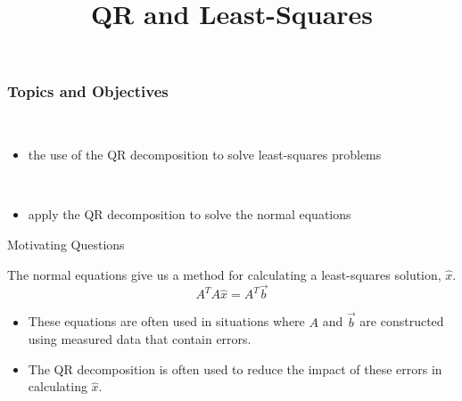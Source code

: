 \title{QR and Least-Squares}
\subtitle{\SubTitleName}
\institute[]{\Course}
\author{\Instructor}
\maketitle   


\begin{frame}\frametitle{Topics and Objectives}
 \\
\begin{itemize}

    \item the use of the QR decomposition to solve least-squares problems
    
\end{itemize}

\vspace{0.5cm}

\\

\begin{itemize}

    \item apply the QR decomposition to solve the normal equations
  
\end{itemize}

\vspace{0.25cm} 
 
 \end{frame}

\begin{frame}{Motivating Questions}

    The normal equations give us a method for calculating a least-squares solution, $\widehat x$. 
    $$
        A ^{T} A \widehat x = A ^{T} \vec b
    $$
    \begin{itemize}
        \item<2-> These equations are often used in situations where $A$ and $\vec b$ are constructed using measured data that contain errors.
        \item<3-> The QR decomposition is often used to reduce the impact of these errors in calculating $\widehat x$. 
    \end{itemize}
    

\end{frame}








